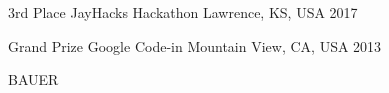 \documentclass[11pt]{resume}
\begin{document}


\begin{cvhonors}

  \cvhonor
  {3rd Place}
  {JayHacks Hackathon}
  {Lawrence, KS, USA}
  {2017}

  \cvhonor
  {Grand Prize}
  {Google Code-in}
  {Mountain View, CA, USA}
  {2013}

\end{cvhonors}



\makecvfooter
    {BAUER}
    {\thepage}
    {\pageref{LastPage}}

\end{document}

